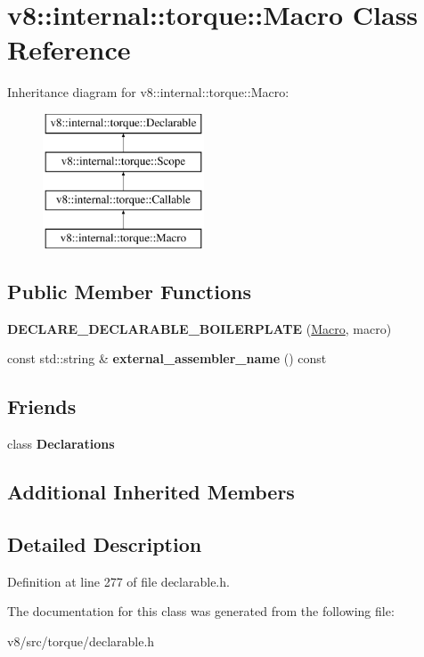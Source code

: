 \hypertarget{classv8_1_1internal_1_1torque_1_1Macro}{}\section{v8\+:\+:internal\+:\+:torque\+:\+:Macro Class Reference}
\label{classv8_1_1internal_1_1torque_1_1Macro}
Inheritance diagram for v8\+:\+:internal\+:\+:torque\+:\+:Macro\+:\begin{figure}[H]
\begin{center}
\leavevmode
\includegraphics[height=4.000000cm]{classv8_1_1internal_1_1torque_1_1Macro}
\end{center}
\end{figure}
\subsection*{Public Member Functions}
\begin{DoxyCompactItemize}
\item 
\mbox{\label{classv8_1_1internal_1_1torque_1_1Macro_ac5e0f2755a9158ec9b0911c62109ced6}} 
{\bfseries D\+E\+C\+L\+A\+R\+E\+\_\+\+D\+E\+C\+L\+A\+R\+A\+B\+L\+E\+\_\+\+B\+O\+I\+L\+E\+R\+P\+L\+A\+TE} (\mbox{\hyperlink{classv8_1_1internal_1_1torque_1_1Macro}{Macro}}, macro)
\item 
\mbox{\label{classv8_1_1internal_1_1torque_1_1Macro_afa26fd5b31690c71f79a86821fcd917e}} 
const std\+::string \& {\bfseries external\+\_\+assembler\+\_\+name} () const
\end{DoxyCompactItemize}
\subsection*{Friends}
\begin{DoxyCompactItemize}
\item 
\mbox{\label{classv8_1_1internal_1_1torque_1_1Macro_a23135931a5f054329315374b774718cf}} 
class {\bfseries Declarations}
\end{DoxyCompactItemize}
\subsection*{Additional Inherited Members}


\subsection{Detailed Description}


Definition at line 277 of file declarable.\+h.



The documentation for this class was generated from the following file\+:\begin{DoxyCompactItemize}
\item 
v8/src/torque/declarable.\+h\end{DoxyCompactItemize}
